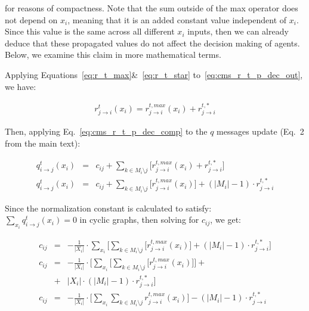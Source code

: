 \noindent for reasons of compactness. Note that the sum outside of the max operator does not depend on $x_i$, meaning that it is an added constant value independent of $x_i$. 
Since this value is the same across all different $x_i$ inputs, then we can already deduce that these propagated values do not affect the decision making of agents.
Below, we examine this claim in more mathematical terms.

Applying Equations~\ref{eq:r_t_max}\&~\ref{eq:r_t_star} to~\ref{eq:cms_r_t_p_dec_out}, we have:

\begin{eqnarray}\label{eq:cms_r_t_p_dec_comp}
    r^t_{j \rightarrow i} (x_i) = r^{t,max}_{j \rightarrow i} (x_i) + r^{t,*}_{j \rightarrow i} 
\end{eqnarray}

\noindent Then, applying Eq.~\ref{eq:cms_r_t_p_dec_comp} to the $q$ messages update (Eq.~2 from the main text):


\begin{eqnarray}\label{eq:q_ij_t_a}
    q^t_{i \rightarrow j}(x_i) &=& c_{ij} + \sum_{k \in M_i \setminus j} \Big  \lbrack r^{t,max}_{j \rightarrow i} (x_i) + r^{t,*}_{j \rightarrow i}  \Big  \rbrack \nonumber \\
    q^t_{i \rightarrow j}(x_i) &=& c_{ij} + \sum_{k \in M_i \setminus j} \Big  \lbrack r^{t,max}_{j \rightarrow i} (x_i) \Big  \rbrack + (|M_i|-1)\cdot r^{t,*}_{j \rightarrow i}
\end{eqnarray}

Since the normalization constant is calculated to satisfy:\\ $\sum_{x_i} q^t_{i \rightarrow j} (x_i) = 0$ in cyclic graphs, then solving for $c_{ij}$, we get:


\begin{eqnarray}\label{eq:c_ij_cond}
    c_{ij} &=& -\frac{1}{|X_i|} \cdot \sum_{x_i} \Big  \lbrack \sum_{k \in M_i \setminus j} \big  \lbrack r^{t,max}_{j \rightarrow i} (x_i)  \big  \rbrack  + (|M_i|-1)\cdot r^{t,*}_{j \rightarrow i}\Big  \rbrack \nonumber \\
    c_{ij} &=& -\frac{1}{|X_i|} \cdot \bigg \lbrack \sum_{x_i}  \Big  \lbrack \sum_{k \in M_i \setminus j} \big  \lbrack r^{t,max}_{j \rightarrow i} (x_i)\big  \rbrack \Big  \rbrack  + \nonumber \\ &+& |X_i|\cdot (|M_i|-1)\cdot r^{t,*}_{j \rightarrow i} \bigg \rbrack  \nonumber \\
    c_{ij} &=& -\frac{1}{|X_i|} \cdot \bigg \lbrack \sum_{x_i}  \sum_{k \in M_i \setminus j} r^{t,max}_{j \rightarrow i} (x_i) \bigg \rbrack  - (|M_i|-1)\cdot r^{t,*}_{j \rightarrow i} 
\end{eqnarray}

